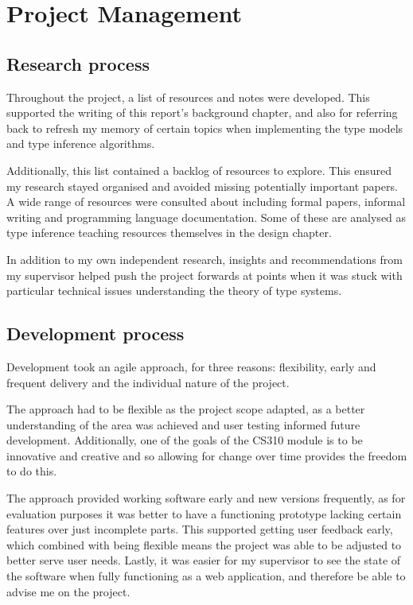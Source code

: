 \documentclass[a4paper,fleqn,oneside,12pt]{report}
\begin{document}
\chapter{Project Management}\label{id:h.3j8xp631ygy}
\section{Research process}\label{id:h.ew85fk610kqt}
Throughout the project, a list of resources and notes were developed. This supported the writing of this report’s background chapter, and also for referring back to refresh my memory of certain topics when implementing the type models and type inference algorithms.

Additionally, this list contained a backlog of resources to explore. This ensured my research stayed organised and avoided missing potentially important papers. A wide range of resources were consulted about including formal papers, informal writing and programming language documentation. Some of these are analysed as type inference teaching resources themselves in the design chapter.

In addition to my own independent research, insights and recommendations from my supervisor helped push the project forwards at points when it was stuck with particular technical issues understanding the theory of type systems.
\section{Development process}\label{id:h.3r2hzi490wg9}
Development took an agile approach, for three reasons: flexibility, early and frequent delivery and the individual nature of the project.

The approach had to be flexible as the project scope adapted, as a better understanding of the area was achieved and user testing informed future development. Additionally, one of the goals of the CS310 module is to be innovative and creative and so allowing for change over time provides the freedom to do this.

The approach provided working software early and new versions frequently, as for evaluation purposes it was better to have a functioning prototype lacking certain features over just incomplete parts. This supported getting user feedback early, which combined with being flexible means the project was able to be adjusted to better serve user needs. Lastly, it was easier for my supervisor to see the state of the software when fully functioning as a web application, and therefore be able to advise me on the project.
\end{document}
